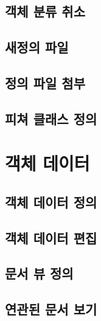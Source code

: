 \documentclass[12pt,a4paper,oneside]{book}
\begin{document}
	\section{객체 분류 취소}
	

	\newpage
	\section{새정의 파일}
	
	\newpage
	\section{정의 파일 첨부}
	

	\newpage
	\section{피쳐 클래스 정의}
	



\newpage
\chapter{객체 데이터}


	\newpage
	\section{객체 데이터 정의}
	
	
	\newpage
	\section{객체 데이터 편집}
	
	
	\newpage
	\section{문서 뷰 정의}
	
	
	\newpage
	\section{연관된 문서 보기}
	
\end{document}
